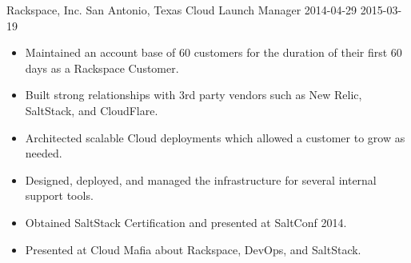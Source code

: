 \roleheader
    {Rackspace, Inc.}
    {San Antonio, Texas}
    {Cloud Launch Manager }
    {2014-04-29}
    {2015-03-19}

\begin{itemize}
    \item Maintained an account base of 60 customers for the duration of their first 60 days as a Rackspace Customer.
    \item Built strong relationships with 3rd party vendors such as New Relic, SaltStack, and CloudFlare.
    \item Architected scalable Cloud deployments which allowed a customer to grow as needed.
    \item Designed, deployed, and managed the infrastructure for several internal support tools.
    \item Obtained SaltStack Certification and presented at SaltConf 2014.
    \item Presented at Cloud Mafia about Rackspace, DevOps, and SaltStack.
\end{itemize}